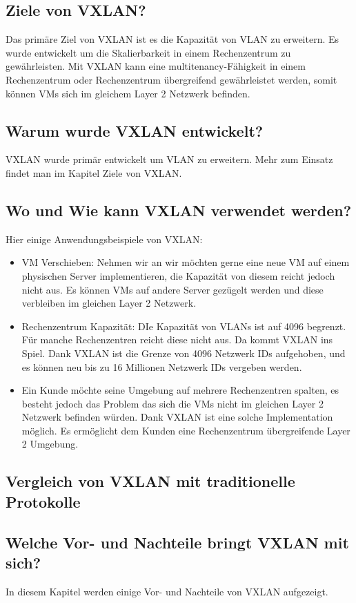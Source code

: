 \documentclass[a4,12pt]{scrartcl}
\begin{document}
\subsection{Ziele von VXLAN?}
Das primäre Ziel von VXLAN ist es die Kapazität von VLAN zu erweitern. Es wurde entwickelt um die Skalierbarkeit in einem Rechenzentrum zu gewährleisten. Mit VXLAN kann eine multitenancy-Fähigkeit in einem Rechenzentrum oder Rechenzentrum übergreifend gewährleistet werden, somit können VMs sich im gleichem Layer 2 Netzwerk befinden. 

\subsection{Warum wurde VXLAN entwickelt?}
VXLAN wurde primär entwickelt um VLAN zu erweitern. Mehr zum Einsatz findet man im Kapitel Ziele von VXLAN. 

\subsection{Wo und Wie kann VXLAN verwendet werden?}
Hier einige Anwendungsbeispiele von VXLAN: 
\begin{itemize}
\item VM Verschieben: Nehmen wir an wir möchten gerne eine neue VM auf einem physischen Server implementieren, die Kapazität von diesem reicht jedoch nicht aus. Es können VMs auf andere Server gezügelt werden und diese verbleiben im gleichen Layer 2 Netzwerk. 
\item Rechenzentrum Kapazität: DIe Kapazität von VLANs ist auf 4096 begrenzt. Für manche Rechenzentren reicht diese nicht aus. Da kommt VXLAN ins Spiel. Dank VXLAN ist die Grenze von 4096 Netzwerk IDs aufgehoben, und es können neu bis zu 16 Millionen Netzwerk IDs vergeben werden. 
\item Ein Kunde möchte seine Umgebung auf mehrere Rechenzentren spalten, es besteht jedoch das Problem das sich die VMs nicht im gleichen Layer 2 Netzwerk befinden würden. Dank VXLAN ist eine solche Implementation möglich. Es ermöglicht dem Kunden eine Rechenzentrum übergreifende Layer 2 Umgebung. 
\end{itemize}

\subsection{Vergleich von VXLAN mit traditionelle Protokolle}



\subsection{Welche Vor- und Nachteile bringt VXLAN mit sich?}
In diesem Kapitel werden einige Vor- und Nachteile von VXLAN aufgezeigt. 
\end{document}
